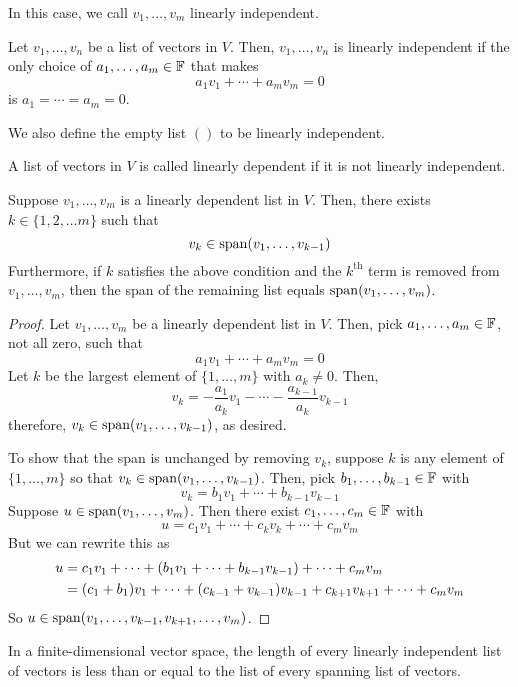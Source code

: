 In this case, we call $v_1, \dots, v_m$ linearly independent.
\begin{definition}
    Let $v_1, \dots, v_n$ be a list of vectors in $V$. Then, $v_1, \dots, v_n$ is linearly independent if the only choice of $a_1, \dots, a_m\in \mathbb F$ that makes
    \[ a_1v_1 + \cdots + a_mv_m = 0\]
    is $a_1 = \cdots = a_m = 0$.

    We also define the empty list $()$ to be linearly independent.
\end{definition}
\begin{definition}
    A list of vectors in $V$ is called linearly dependent if it is not linearly independent.
\end{definition}
\begin{theorem}
    Suppose $v_1, \dots, v_m$ is a linearly dependent list in $V$. Then, there exists $k\in\{1, 2, \dots m\}$ such that
    \[ v_k \in \operatorname{span}(v_1, \dots, v_{k-1})\]
    Furthermore, if $k$ satisfies the above condition and the $k^\text{th}$ term is removed from $v_1, \dots, v_m$, then the span of the remaining list equals $\operatorname{span}(v_1, \dots, v_m)$.
\end{theorem}
\begin{proof}
    Let $v_1, \dots, v_m$ be a linearly dependent list in $V$. Then, pick $a_1, \dots, a_m\in\mathbb F$, not all zero, such that
    \[ a_1v_1 + \cdots + a_mv_m = 0\]
    Let $k$ be the largest element of $\{1, \dots, m\}$ with $a_k \ne 0$. Then, 
    \[ v_k = -\frac{a_1}{a_k}v_1 - \cdots - \frac{a_{k-1}}{a_k}v_{k-1} \]
    therefore, $v_k\in\operatorname{span}(v_1, \dots, v_{k-1})$, as desired.

    To show that the span is unchanged by removing $v_k$, suppose $k$ is any element of $\{1, \dots, m\}$ so that $v_k \in \operatorname{span}(v_1, \dots, v_{k-1})$. Then, pick $b_1, \dots, b_{k-1}\in \mathbb F$ with
    \[ v_k = b_1v_1 + \cdots + b_{k-1}v_{k-1} \]
    Suppose $u\in \operatorname{span}(v_1, \dots, v_m)$. Then there exist $c_1, \dots, c_m\in \mathbb F$ with
    \[ u = c_1v_1 + \cdots + c_kv_k + \cdots + c_mv_m\]
    But we can rewrite this as
    \begin{align*}
        u &= c_1v_1 + \cdots + \pqty{b_1v_1 + \cdots + b_{k-1}v_{k-1}} + \cdots + c_mv_m \\
        &= (c_1+b_1)v_1 + \cdots + (c_{k-1}+v_{k-1})v_{k-1} + c_{k+1}v_{k+1} + \cdots + c_mv_m
    \end{align*}
    So $u\in\operatorname{span}(v_1, \dots, v_{k-1}, v_{k+1}, \dots, v_m)$.
\end{proof}
\begin{theorem}
    In a finite-dimensional vector space, the length of every linearly independent list of vectors is less than or equal to the list of every spanning list of vectors.
\end{theorem}

